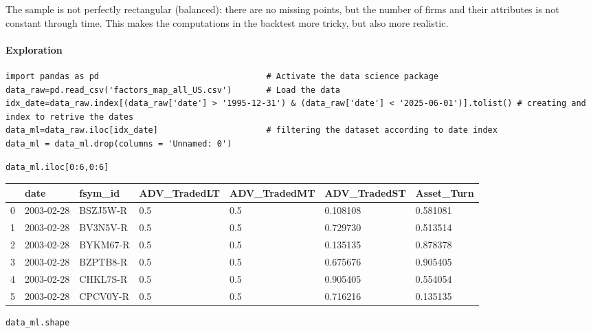 The sample is not perfectly rectangular (balanced): there are no missing points, but the number of firms and their attributes is not constant through time. This makes the computations in the backtest more tricky, but also more realistic.

\paragraph{Exploration}

\begin{verbatim}
import pandas as pd                                  # Activate the data science package
data_raw=pd.read_csv('factors_map_all_US.csv')       # Load the data
idx_date=data_raw.index[(data_raw['date'] > '1995-12-31') & (data_raw['date'] < '2025-06-01')].tolist() # creating and index to retrive the dates
data_ml=data_raw.iloc[idx_date]                      # filtering the dataset according to date index
data_ml = data_ml.drop(columns = 'Unnamed: 0')
\end{verbatim}

\begin{verbatim}
data_ml.iloc[0:6,0:6]
\end{verbatim}

\bigskip\noindent
\begin{tabular}{p{}p{}p{}p{}p{}p{}p{}}
\toprule
 & date & fsym\_id & ADV\_TradedLT & ADV\_TradedMT & ADV\_TradedST & Asset\_Turn \\
\hline
0 & 2003-02-28 & BSZJ5W-R & 0.5 & 0.5 & 0.108108 & 0.581081 \\
\hline
1 & 2003-02-28 & BV3N5V-R & 0.5 & 0.5 & 0.729730 & 0.513514 \\
\hline
2 & 2003-02-28 & BYKM67-R & 0.5 & 0.5 & 0.135135 & 0.878378 \\
\hline
3 & 2003-02-28 & BZPTB8-R & 0.5 & 0.5 & 0.675676 & 0.905405 \\
\hline
4 & 2003-02-28 & CHKL7S-R & 0.5 & 0.5 & 0.905405 & 0.554054 \\
\hline
5 & 2003-02-28 & CPCV0Y-R & 0.5 & 0.5 & 0.716216 & 0.135135 \\
\hline
\bottomrule
\end{tabular}

\bigskip

\begin{verbatim}
data_ml.shape
\end{verbatim}

